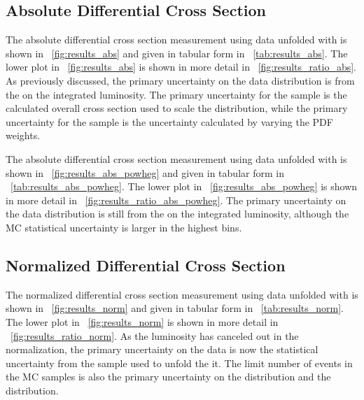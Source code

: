 \subsection{Absolute Differential Cross Section}
\label{ssec:results_abs}

The absolute differential cross section measurement using data unfolded with
\MADGRAPH is shown in \FIG~\ref{fig:results_abs} and given in tabular form in
\TAB~\ref{tab:results_abs}. The lower plot in \FIG~\ref{fig:results_abs} is
shown in more detail in \FIG~\ref{fig:results_ratio_abs}. As previously
discussed, the primary uncertainty on the data distribution is from the on the
integrated luminosity. The primary uncertainty for the \MADGRAPH sample is the
\FEWZ calculated overall cross section used to scale the distribution, while
the primary uncertainty for the \POWHEG sample is the uncertainty calculated by
varying the \CTten PDF weights.




The absolute differential cross section measurement using data unfolded with
\POWHEG is shown in \FIG~\ref{fig:results_abs_powheg} and given in tabular form
in \TAB~\ref{tab:results_abs_powheg}. The lower plot in
\FIG~\ref{fig:results_abs_powheg} is shown in more detail in
\FIG~\ref{fig:results_ratio_abs_powheg}. The primary uncertainty on the data
distribution is still from the on the integrated luminosity, although the MC
statistical uncertainty is larger in the highest \phistar bins.




\subsection{Normalized Differential Cross Section}
\label{ssec:results_norm}

The normalized differential cross section measurement using data unfolded with
\MADGRAPH is shown in \FIG~\ref{fig:results_norm} and given in tabular form in
\TAB~\ref{tab:results_norm}. The lower plot in \FIG~\ref{fig:results_norm} is
shown in more detail in \FIG~\ref{fig:results_ratio_norm}. As the luminosity
has canceled out in the normalization, the primary uncertainty on the data is
now the statistical uncertainty from the \MADGRAPH sample used to unfold the
it. The limit number of events in the MC samples is also the primary
uncertainty on the \MADGRAPH distribution and the \POWHEG distribution.

